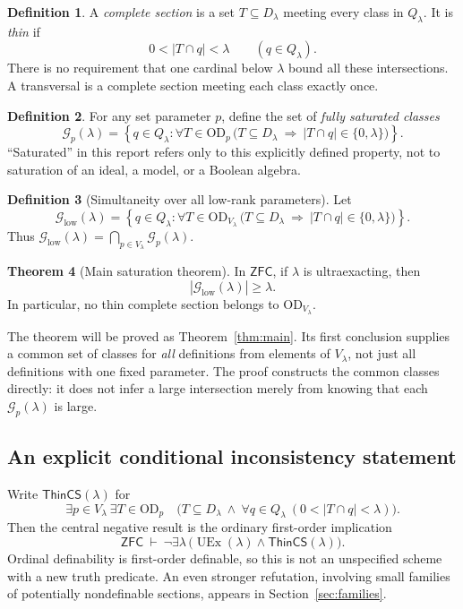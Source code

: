 \documentclass[11pt,letterpaper]{article}
\theoremstyle{definition}
\newtheorem{definition}{Definition}[section]
\newtheorem{theorem}[definition]{Theorem}
\newcommand{\ZFC}{\mathsf{ZFC}}
\newcommand{\OD}{\mathrm{OD}}
\newcommand{\UEx}{\operatorname{UEx}}
\numberwithin{equation}{section}
\newcommand{\Good}{\mathcal G}
\begin{document}
\begin{definition}\label{def:thin}
A \emph{complete section} is a set $T\subseteq D_\lambda$ meeting every class in
$Q_\lambda$. It is \emph{thin} if
\[
  0<|T\cap q|<\lambda\qquad(q\in Q_\lambda).
\]
There is no requirement that one cardinal below $\lambda$ bound all these
intersections. A transversal is a complete section meeting each class exactly
once.
\end{definition}

\begin{definition}\label{def:good}
For any set parameter $p$, define the set of \emph{fully saturated classes}
\[
 \Good_p(\lambda)=
 \left\{q\in Q_\lambda:
   \forall T\in\OD_p\,
   \bigl(T\subseteq D_\lambda\ \Longrightarrow\ |T\cap q|\in\{0,\lambda\}\bigr)
 \right\}.
\]
``Saturated'' in this report refers only to this explicitly defined property,
not to saturation of an ideal, a model, or a Boolean algebra.
\end{definition}

\begin{definition}[Simultaneity over all low-rank parameters]\label{def:good-low}
Let
\[
 \Good_{\mathrm{low}}(\lambda)=
 \left\{q\in Q_\lambda:
   \forall T\in\OD_{V_\lambda}\,
   \bigl(T\subseteq D_\lambda\ \Longrightarrow\ |T\cap q|\in\{0,\lambda\}\bigr)
 \right\}.
\]
Thus $\Good_{\mathrm{low}}(\lambda)=\bigcap_{p\in V_\lambda}\Good_p(\lambda)$.
\end{definition}

\begin{theorem}[Main saturation theorem]\label{thm:main-intro}
In $\ZFC$, if $\lambda$ is ultraexacting, then
\[
                       |\Good_{\mathrm{low}}(\lambda)|\ge\lambda.
\]
In particular, no thin complete section belongs to $\OD_{V_\lambda}$.
\end{theorem}

The theorem will be proved as Theorem~\ref{thm:main}. Its first conclusion
supplies a common set of classes for \emph{all} definitions from elements of
$V_\lambda$, not just all definitions with one fixed parameter. The proof
constructs the common classes directly: it does not infer a large intersection
merely from knowing that each $\Good_p(\lambda)$ is large.

\subsection{An explicit conditional inconsistency statement}

Write $\mathsf{ThinCS}(\lambda)$ for
\[
 \exists p\in V_\lambda\ \exists T\in\OD_p\quad
    \bigl(T\subseteq D_\lambda\ \wedge\
          \forall q\in Q_\lambda\ (0<|T\cap q|<\lambda)\bigr).
\]
Then the central negative result is the ordinary first-order implication
\begin{equation}\label{eq:inconsistency}
 \ZFC\ \vdash\
 \neg\exists\lambda\,
       \bigl(\UEx(\lambda)\wedge\mathsf{ThinCS}(\lambda)\bigr).
\end{equation}
Ordinal definability is first-order definable, so this is not an unspecified
scheme with a new truth predicate. An even stronger refutation, involving
small families of potentially nondefinable sections, appears in
Section~\ref{sec:families}.
\end{document}
